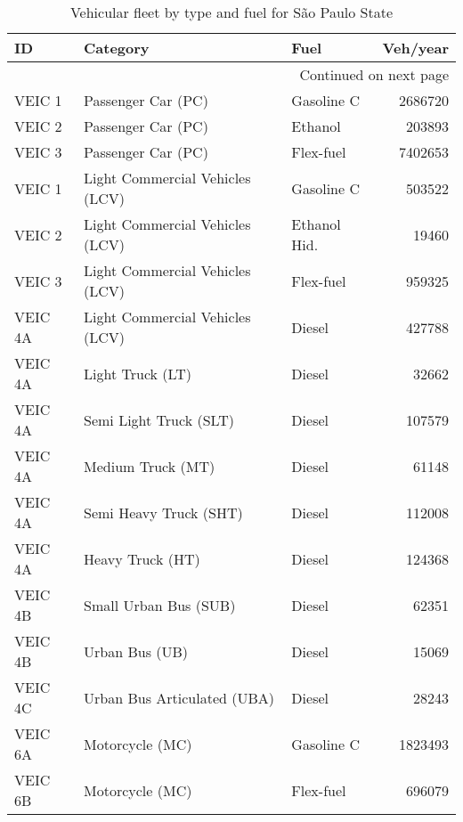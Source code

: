 {\footnotesize
\begin{longtable}{lllr}
\caption{Vehicular fleet by type and fuel for São Paulo State \citep{CETESB2019a}}\label{tab:fleet}\\
\toprule
	\textbf{ID} &    \textbf{ Category} & \textbf{Fuel} & \textbf{Veh/year} \\
\midrule
\endhead
\midrule
\multicolumn{4}{r}{{Continued on next page}} \\
\midrule
\endfoot

\bottomrule
\endlastfoot
  VEIC 1 &               Passenger Car (PC) &    Gasoline C &   2686720 \\
  VEIC 2 &               Passenger Car (PC) &       Ethanol &    203893 \\
  VEIC 3 &               Passenger Car (PC) &     Flex-fuel &   7402653 \\
  VEIC 1 &  Light Commercial Vehicles (LCV) &    Gasoline C &    503522 \\
  VEIC 2 &  Light Commercial Vehicles (LCV) &  Ethanol Hid. &     19460 \\
  VEIC 3 &  Light Commercial Vehicles (LCV) &     Flex-fuel &    959325 \\
 VEIC 4A &  Light Commercial Vehicles (LCV) &        Diesel &    427788 \\
 VEIC 4A &                 Light Truck (LT) &        Diesel &     32662 \\
 VEIC 4A &           Semi Light Truck (SLT) &        Diesel &    107579 \\
 VEIC 4A &                Medium Truck (MT) &        Diesel &     61148 \\
 VEIC 4A &           Semi Heavy Truck (SHT) &        Diesel &    112008 \\
 VEIC 4A &                 Heavy Truck (HT) &        Diesel &    124368 \\
 VEIC 4B &            Small Urban Bus (SUB) &        Diesel &     62351 \\
 VEIC 4B &                   Urban Bus (UB) &        Diesel &     15069 \\
 VEIC 4C &      Urban Bus Articulated (UBA) &        Diesel &     28243 \\
 VEIC 6A &                  Motorcycle (MC) &    Gasoline C &   1823493 \\
 VEIC 6B &                  Motorcycle (MC) &     Flex-fuel &    696079 \\
\end{longtable}}